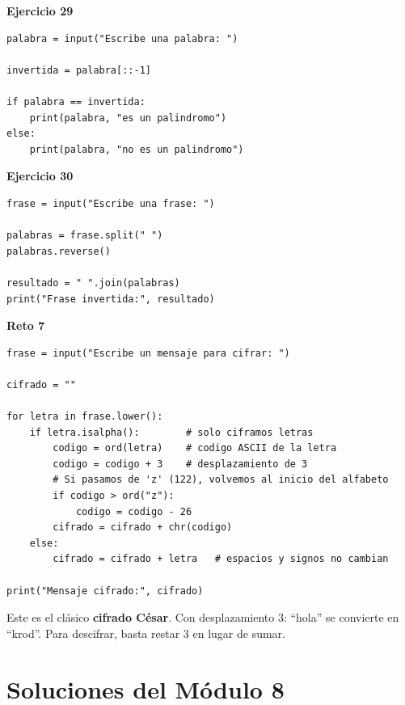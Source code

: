\documentclass[12pt,a4paper]{article}
\begin{document}
\begin{cajaSolucion}
\textbf{Ejercicio 29}
\begin{lstlisting}[style=pythonStyle]
palabra = input("Escribe una palabra: ")

invertida = palabra[::-1]

if palabra == invertida:
    print(palabra, "es un palindromo")
else:
    print(palabra, "no es un palindromo")
\end{lstlisting}
\end{cajaSolucion}

\begin{cajaSolucion}
\textbf{Ejercicio 30}
\begin{lstlisting}[style=pythonStyle]
frase = input("Escribe una frase: ")

palabras = frase.split(" ")
palabras.reverse()

resultado = " ".join(palabras)
print("Frase invertida:", resultado)
\end{lstlisting}
\end{cajaSolucion}

\begin{cajaSolucion}
\textbf{Reto 7}
\begin{lstlisting}[style=pythonStyle]
frase = input("Escribe un mensaje para cifrar: ")

cifrado = ""

for letra in frase.lower():
    if letra.isalpha():        # solo ciframos letras
        codigo = ord(letra)    # codigo ASCII de la letra
        codigo = codigo + 3    # desplazamiento de 3
        # Si pasamos de 'z' (122), volvemos al inicio del alfabeto
        if codigo > ord("z"):
            codigo = codigo - 26
        cifrado = cifrado + chr(codigo)
    else:
        cifrado = cifrado + letra   # espacios y signos no cambian

print("Mensaje cifrado:", cifrado)
\end{lstlisting}

\begin{cajaNota}
Este es el clásico \textbf{cifrado César}. Con desplazamiento 3: ``hola'' se convierte en ``krod''. Para descifrar, basta restar 3 en lugar de sumar.
\end{cajaNota}
\end{cajaSolucion}

\section{Soluciones del Módulo 8}
\end{document}
